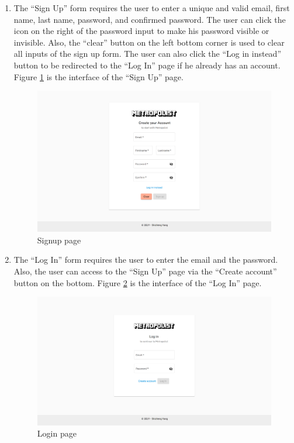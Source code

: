 \begin{enumerate}
  \item The ``Sign Up'' form requires the user to enter a unique and valid email, first name, last name, password, and confirmed password. The user can click the icon on the right of the password input to make his password visible or invisible. Also, the ``clear'' button on the left bottom corner is used to clear all inputs of the sign up form. The user can also click the ``Log in instead'' button to be redirected to the ``Log In'' page if he already has an account. Figure \ref{fig:GUI signup} is the interface of the ``Sign Up'' page.

  \begin{figure}[htbp]
    \includegraphics[width=\textwidth]{section04/assets/GUI-signup.png}
    \caption{Signup page}
    \label{fig:GUI signup}
  \end{figure}

  \item The ``Log In'' form requires the user to enter the email and the password. Also, the user can access to the ``Sign Up'' page via the ``Create account'' button on the bottom. Figure \ref{fig:GUI login} is the interface of the ``Log In'' page.

  \begin{figure}[htbp]
    \includegraphics[width=\textwidth]{section04/assets/GUI-login.png}
    \caption{Login page}
    \label{fig:GUI login}
  \end{figure}


\end{enumerate}
